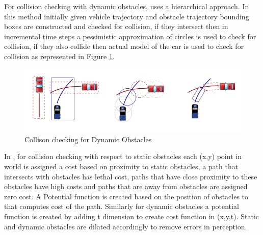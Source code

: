 For collision checking with dynamic obstacles, \cite{kolski_thesis} uses a hierarchical approach. In this method initially given vehicle trajectory and obstacle trajectory bounding boxes are constructed and checked for collision, if they intersect then in incremental time steps a pessimistic approximation of circles is used to check for collision, if they also collide then actual model of the car is used to check for collision as represented in Figure \ref{kolskidynamicobst}.

\begin{figure}
	\centering
	\includegraphics[width=1.0\textwidth]{Images/related_work/kolskidynamicobstacles.png}
	\caption{Collison checking for Dynamic Obstacles \cite{kolski_thesis}}
	\label{kolskidynamicobst}
\end{figure} 

In \cite{cmu_parallel_thesis}, for collision checking with respect to static obstacles each (x,y) point in world is assigned a cost based on proximity to static obstacles, a path that intersects with obstacles has lethal cost, paths that have close proximity to these obstacles have high costs and paths that are away from obstacles are assigned zero cost. A Potential function is created based on the position of obstacles to that computes cost of the path. Similarly for dynamic obstacles a potential function is created by adding t dimension to create cost function in (x,y,t). Static and dynamic obstacles are dilated accordingly to remove errors in perception.  

